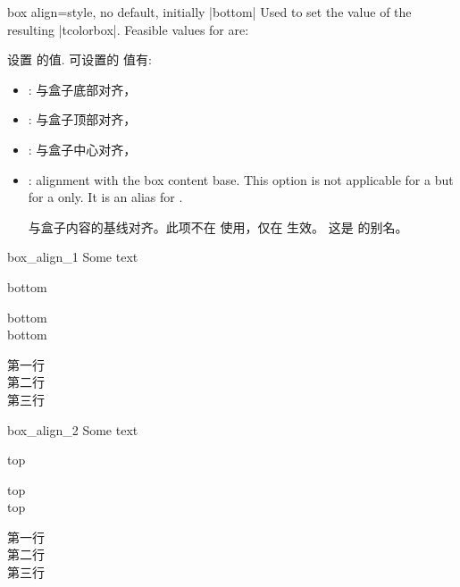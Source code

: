 \begin{docTcbKey}[][doc new=2014-10-10]{box align}{=}{style, no default, initially |bottom|}
Used to set the  value of the resulting |tcolorbox|.
Feasible values for  are:

设置  的值.
可设置的  值有:  
\begin{itemize}
\item{}: %
与盒子底部对齐，
\item{}: %
与盒子顶部对齐，
\item{}: %
与盒子中心对齐，
\item{}: 
alignment with the box content base. This option
is not applicable for a  but for a  only.
It is an alias for .

与盒子内容的基线对齐。此项不在  使用，仅在  生效。
这是  的别名。
\end{itemize}

\begin{exdispExample}{box_align_1}
Some text\dotfill
\begin{tcolorbox}[box align=bottom]
bottom
\end{tcolorbox}
\begin{tcolorbox}[box align=bottom]
bottom\\bottom
\end{tcolorbox}
\begin{tcolorbox}
第一行\\第二行\\第三行
\end{tcolorbox}
\end{exdispExample}

\begin{exdispExample}{box_align_2}
Some text\dotfill
\begin{tcolorbox}[box align=top]
top
\end{tcolorbox}
\begin{tcolorbox}[box align=top]
top\\top
\end{tcolorbox}
\begin{tcolorbox}
第一行\\第二行\\第三行
\end{tcolorbox}
\end{exdispExample}


\end{docTcbKey}
